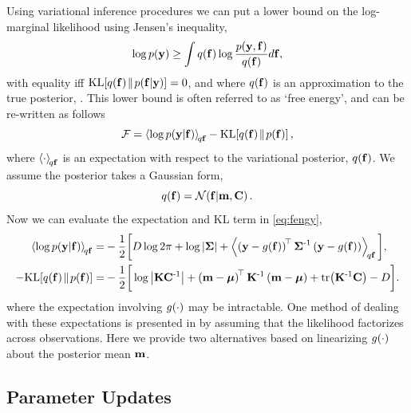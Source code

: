 \documentclass{article} %
\begin{document}
Using variational inference procedures we can put a lower bound on the
log-marginal likelihood using Jensen's inequality, 
\begin{equation}
    \log p\!\left({\mathbf{y}}\right) \geq \int q\!\left({\mathbf{f}}\right) \log 
        \frac{p\!\left({\mathbf{y}, \mathbf{f}}\right)}{q\!\left({\mathbf{f}}\right)} d\mathbf{f},
\end{equation}
with equality iff $\text{KL}\!\left[{{q\!\left({\mathbf{f}}\right)}\!\parallel\!{p\!\left({\mathbf{f}}\middle\vert{\ensuremath{\mathbf{y}}}\right)}}\right] = 0$, and where
$q\!\left({\mathbf{f}}\right)$ is an approximation to the true posterior,
\probC{\lstate}{\obs}. This lower bound is often referred to as `free energy',
and can be re-written as follows
\begin{equation}
    \mathcal{F} = \left\langle{\log \ensuremath{p\!\left({\mathbf{y}}\middle\vert{\ensuremath{\mathbf{f}}}\right)}}\right\rangle_{\!{q\mathbf{f}}}
        - \text{KL}\!\left[{{q\!\left({\mathbf{f}}\right)}\!\parallel\!{p\!\left({\mathbf{f}}\right)}}\right],
    \label{eq:fengy}
\end{equation}
where $\left\langle{\cdot}\right\rangle_{\!{q\mathbf{f}}}$ is an expectation with respect to the
variational posterior, $q\!\left({\mathbf{f}}\right)$. We assume the posterior takes a
Gaussian form,
\begin{equation}
    q\!\left({\mathbf{f}}\right) = \mathcal{N}\!\left({\mathbf{f}}\middle\vert{\ensuremath{\mathbf{m}}, \ensuremath{\mathbf{C}}}\right). \label{eq:varpost}
\end{equation}
Now we can evaluate the expectation and KL term in \eqref{eq:fengy},
\begin{align}
    \expec{q\lstate}{\log \probC{\obs}{\lstate}}
        =& - \frac{1}{2} \bigg[ 
            D\log{2\pi} + \log\deter{\lcov} 
            + \expec{q\lstate}{\brac{\obs - \nonlin{\lstate}}\transpose\lcov\inv
            \brac{\obs - \nonlin{\lstate}}}\bigg],
            \label{eq:qlike} \\
     - \KL{\qrob{\lstate}}{\prob{\lstate}}
        =& - \frac{1}{2} \bigg[\log\deter{\prcov\pocov\inv}
            + \brac{\pomean - \prmean}\transpose\prcov\inv
            \brac{\pomean - \prmean}
            + \trace{\prcov\inv\pocov} - D\bigg] \label{eq:qkl}.
\end{align}
where the expectation involving $g\!\left({{\cdot}}\right)$ may be intractable. One method
of dealing with these expectations is presented in \cite{Opper2009} by assuming
that the likelihood factorizes across observations. Here we provide two
alternatives based on linearizing $g\!\left({{\cdot}}\right)$ about  the posterior mean
$\mathbf{m}$.


\subsection{Parameter Updates}
\end{document}
